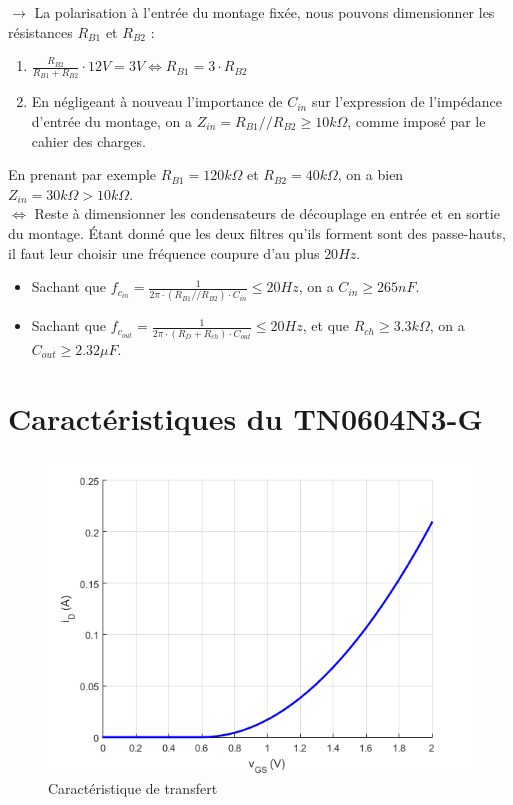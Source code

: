 \documentclass{../template/labo}
\begin{document}
{$\rightarrow$ La polarisation à l'entrée du montage fixée, nous pouvons dimensionner les résistances $R_{B1}$ et $R_{B2}$ :
\begin{enumerate}
	\item $\frac{R_{B2}}{R_{B1} + R_{B2}} \cdot 12 V = 3 V \Leftrightarrow R_{B1} = 3 \cdot R_{B2}$
	\item En négligeant à nouveau l'importance de $C_{in}$ sur l'expression de l'impédance d'entrée du montage, on a $Z_{in} = R_{B1} // R_{B2} \geq 10 k\Omega$, comme imposé par le cahier des charges.
\end{enumerate}
En prenant par exemple $\boxed{R_{B1} = 120 k\Omega}$ et $\boxed{R_{B2} = 40 k\Omega}$, on a bien $Z_{in} = 30 k\Omega > 10 k\Omega$.\\

$\Leftrightarrow$ Reste à dimensionner les condensateurs de découplage en entrée et en sortie du montage.
Étant donné que les deux filtres qu'ils forment sont des passe-hauts, il faut leur choisir une fréquence coupure d'au plus $20 Hz$.
\begin{itemize}
	\item Sachant que $f_{c_{in}} = \frac{1}{2\pi \cdot (R_{B1}//R_{B2}) \cdot C_{in}} \leq 20 Hz$, on a $\boxed{C_{in} \geq 265 nF}$.
	\item Sachant que $f_{c_{out}} = \frac{1}{2\pi \cdot (R_D + R_{ch}) \cdot C_{out}} \leq 20 Hz$,  et que $R_{ch} \geq 3.3 k\Omega$, on a $\boxed{C_{out} \geq 2.32 \mu F}$.
\end{itemize}



}

\clearpage
\appendix
\section{Caractéristiques du TN0604N3-G}
\begin{figure}[H]
	\centering
	\includegraphics[width=.8\textwidth]{iD_vGS.png}
	\caption{Caractéristique de transfert}
\end{figure}
\end{document}
